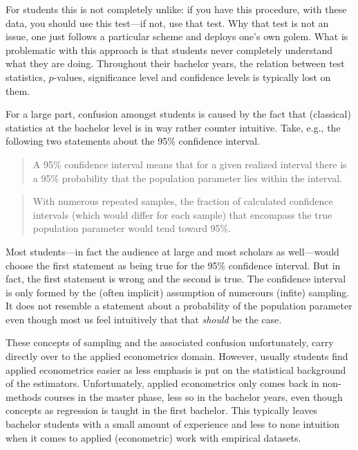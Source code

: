 \documentclass[fleqn,10pt]{SelfArx} %
\begin{document}
For students this is not completely unlike: if you have this procedure, with
these data, you should use this test---if not, use that test. Why that test is
not an issue, one just follows a particular scheme and deploys one's own golem. What is
problematic with this approach is that students never completely understand what
they are doing. Throughout their bachelor years, the relation between test
statistics, $p$-values, significance level and confidence levels is typically
lost on them.

For a large part, confusion amongst students is caused by the fact that
(classical) statistics at the bachelor level is in way rather counter intuitive.
Take, e.g., the following two statements about the 95\% confidence interval.

\begin{quotation}
  A 95\% confidence interval means that for a given realized interval there is a 95\% probability that the population parameter lies within the interval.
\end{quotation}

\begin{quotation}
  With numerous repeated samples, the fraction of calculated confidence intervals (which would differ for each sample) that encompass the true population parameter would tend toward 95\%.
\end{quotation}

Most students---in fact the audience at large and most scholars as well---would
choose the first statement as being true for the 95\% confidence interval. But
in fact, the first statement is wrong and the second is true. The confidence
interval is only formed by the (often implicit) assumption of numerours (infite)
sampling. It does not resemble a statement about a probability of the population
parameter even though most us feel intuitively that that \emph{should} be the
case.

These concepts of sampling and the associated confusion unfortunately,
carry directly over to the applied econometrics domain. However, usually
students find applied econometrics easier as less emphasis is put on the
statistical background of the estimators. Unfortunately, applied econometrics
only comes back in non-methods courses in the master phase, less so in the bachelor years,
even though concepts as regression is taught in the first bachelor. This
typically leaves bachelor students with a small amount of experience and less to none
intuition when it comes to applied (econometric) work with empirical datasets.   
\end{document}
